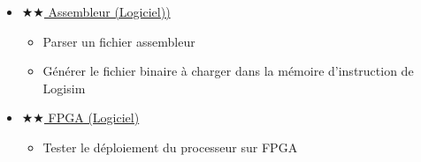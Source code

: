\documentclass{article}
\begin{document}
\begin{itemize}
        \item \hyperref[sec:ASM]{$\bigstar\bigstar$ Assembleur (Logiciel))}
        \begin{itemize}
            \item Parser un fichier assembleur
            \item Générer le fichier binaire à charger dans la mémoire d'instruction de Logisim
        \end{itemize}
        \item \hyperref[sec:FPGA]{$\bigstar\bigstar$ FPGA (Logiciel)}
        \begin{itemize}
            \item Tester le déploiement du processeur sur FPGA
        \end{itemize}
    \end{itemize}
\end{document}
